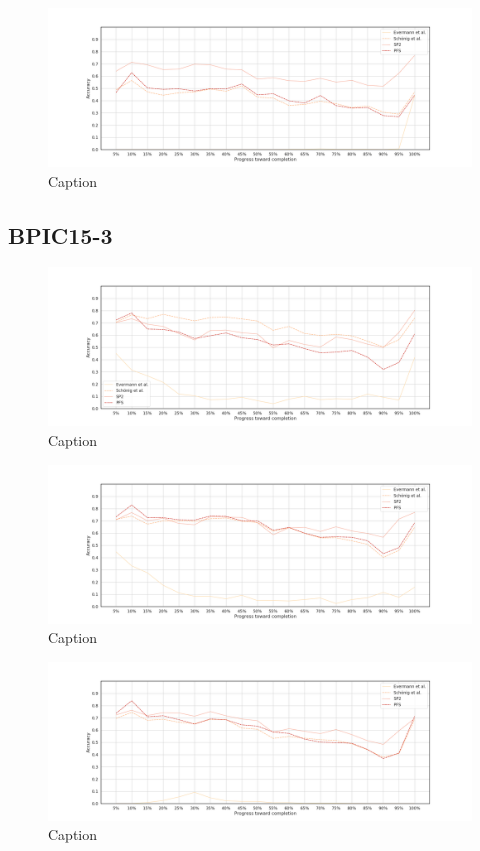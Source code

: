 \begin{figure}[!htb]
    \centering
    \includegraphics[width=\textwidth]{gfx/stability/bpic2015_2/windowed_stability.png}
    \caption{Caption}
    \label{fig:my_label}
\end{figure}

\FloatBarrier
\subsection{BPIC15-3}
\begin{figure}[!htb]
    \centering
    \includegraphics[width=\textwidth]{gfx/stability/bpic2015_3/individual_stability.png}
    \caption{Caption}
    \label{fig:my_label}
\end{figure}
\begin{figure}[!htb]
    \centering
    \includegraphics[width=\textwidth]{gfx/stability/bpic2015_3/grouped_stability.png}
    \caption{Caption}
    \label{fig:my_label}
\end{figure}
\begin{figure}[!htb]
    \centering
    \includegraphics[width=\textwidth]{gfx/stability/bpic2015_3/padded_stability.png}
    \caption{Caption}
    \label{fig:my_label}
\end{figure}
